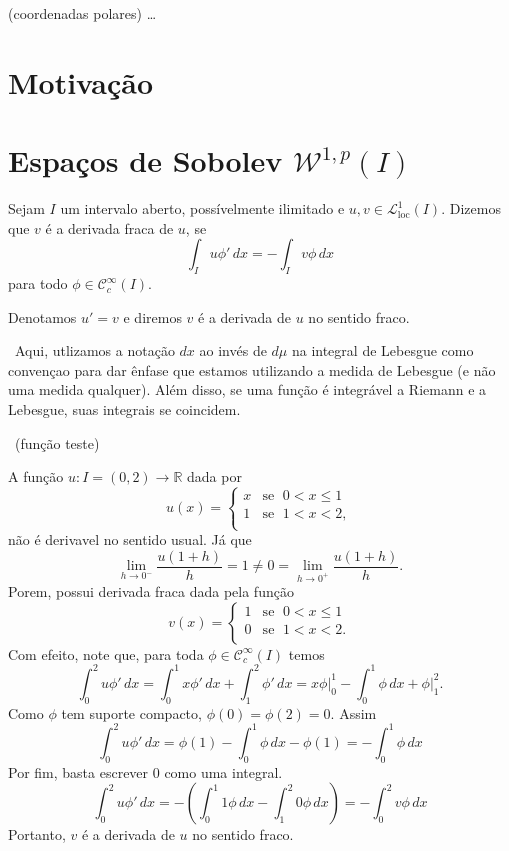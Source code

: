 \documentclass[a4paper, 11pt]{book}
\theoremstyle{definition}
\newcommand{\obs}{\noindent{\textbf{\textcolor{black}{\sffamily Observação:}}}~}
\newcommand{\bR}{\mathbb{R}}
\newcommand{\cC}{\mathcal{C}}
\newcommand{\cL}{\mathcal{L}}
\newcommand{\cW}{\mathcal{W}}
\begin{document}
\begin{tbox}
    (coordenadas polares) \dots
\end{tbox}

\section{Motivação}

\section{Espaços de Sobolev $\cW^{1,p}(I)$}

\begin{dbox}
    Sejam $I$ um intervalo aberto, possívelmente ilimitado e $u,v \in \cL^1_{\mathrm{loc}}(I)$.
    Dizemos que $v$ é a derivada fraca de $u$, se
    \[
        \int_I u \phi' \, dx = -\int_I v \phi\,dx   
    \]
    para todo $\phi \in \cC^\infty_c(I)$.
\end{dbox}

Denotamos $u' = v$ e diremos $v$ é a derivada de $u$ no sentido fraco.

\obs Aqui, utlizamos a notação $dx$ ao invés de $d\mu$ na integral de Lebesgue como convençao para dar ênfase que estamos utilizando a medida de Lebesgue (e não uma medida qualquer).
Além disso, se uma função é integrável a Riemann e a Lebesgue, suas integrais se coincidem.

\obs (função teste)

\begin{ex} \label{ex:derivada-fraca-R}
    A função $u : I  =(0,2) \to \bR$ dada por
    \[
        u(x) = \left\{
            \begin{array}{rl}
                x & \text{se }\; 0 < x \leqslant 1\\
                1 & \text{se }\; 1 < x < 2,\\
            \end{array}
        \right.
    \]
    não é derivavel no sentido usual. Já que
    \[
        \lim_{h\to0^-} \frac{u(1 + h)}{h} = 1 \neq 0 = \lim_{h\to0^+} \frac{u(1 + h)}{h}.
    \]
    Porem, possui derivada fraca dada pela função
    \[
        v(x) = \left\{
            \begin{array}{rl}
                1 & \text{se }\; 0 < x \leqslant 1\\
                0 & \text{se }\; 1 < x < 2.\\
            \end{array}
        \right.
    \]
    Com efeito, note que, para toda $\phi \in \cC^\infty_c(I)$ temos
    \[
        \int_0^2 u \phi' \,dx = \int_0^1 x \phi' \,dx + \int_1^2 \phi' \,dx = x \phi \bigg|_0^1 - \int_0^1 \phi \,dx + \phi \bigg|_1^2.
    \]
    Como $\phi$ tem suporte compacto, $\phi(0) = \phi(2) = 0$. Assim
    \[
        \int_0^2 u \phi' \,dx = \phi(1) - \int_0^1 \phi \,dx - \phi(1) = -\int_0^1 \phi \,dx
    \]
    Por fim, basta escrever $0$ como uma integral.
    \[
        \int_0^2 u \phi' \,dx = - \left(  \int_0^1 1\phi \, dx - \int_1^2 0\phi \,dx  \right) = -\int_0^2 v \phi \,dx
    \]
    Portanto, $v$ é a derivada de $u$ no sentido fraco.
\end{ex}
\end{document}
